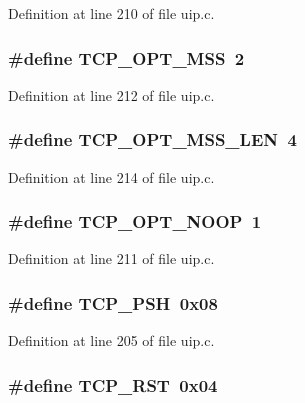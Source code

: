 Definition at line 210 of file uip.c.

\hypertarget{group__uip_ga691688604655ea8943d15f14c60027d8}{
\subsubsection[{TCP\_\-OPT\_\-MSS}]{\setlength{\rightskip}{0pt plus 5cm}\#define TCP\_\-OPT\_\-MSS~2}}
\label{group__uip_ga691688604655ea8943d15f14c60027d8}


Definition at line 212 of file uip.c.

\hypertarget{group__uip_ga12f3bf821224b8e7b48a57ed3cea15cf}{
\subsubsection[{TCP\_\-OPT\_\-MSS\_\-LEN}]{\setlength{\rightskip}{0pt plus 5cm}\#define TCP\_\-OPT\_\-MSS\_\-LEN~4}}
\label{group__uip_ga12f3bf821224b8e7b48a57ed3cea15cf}


Definition at line 214 of file uip.c.

\hypertarget{group__uip_ga9f1822e1d231235edacad691f3cb7bbb}{
\subsubsection[{TCP\_\-OPT\_\-NOOP}]{\setlength{\rightskip}{0pt plus 5cm}\#define TCP\_\-OPT\_\-NOOP~1}}
\label{group__uip_ga9f1822e1d231235edacad691f3cb7bbb}


Definition at line 211 of file uip.c.

\hypertarget{group__uip_ga1320fd0006a2f70138bc2d0018dda829}{
\subsubsection[{TCP\_\-PSH}]{\setlength{\rightskip}{0pt plus 5cm}\#define TCP\_\-PSH~0x08}}
\label{group__uip_ga1320fd0006a2f70138bc2d0018dda829}


Definition at line 205 of file uip.c.

\hypertarget{group__uip_ga5ca559def464ef20d8b1f7d32f2f160d}{
\subsubsection[{TCP\_\-RST}]{\setlength{\rightskip}{0pt plus 5cm}\#define TCP\_\-RST~0x04}}
\label{group__uip_ga5ca559def464ef20d8b1f7d32f2f160d}


